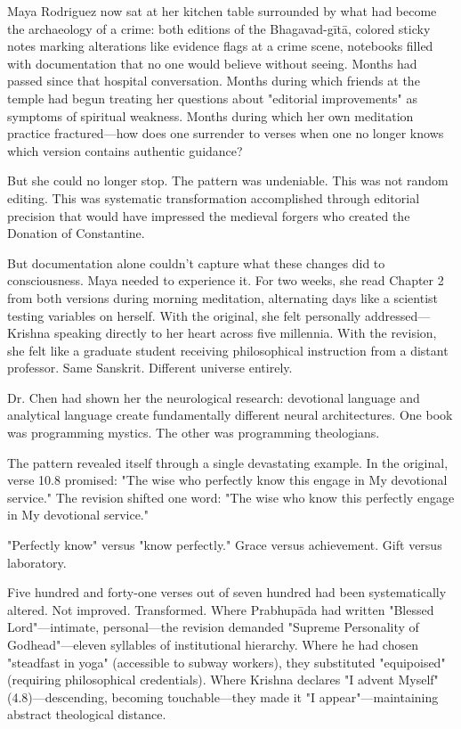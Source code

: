 \documentclass[12pt,twoside]{book}
\begin{document}
Maya Rodriguez now sat at her kitchen table surrounded by what had become the archaeology of a crime: both editions of the Bhagavad-gītā, colored sticky notes marking alterations like evidence flags at a crime scene, notebooks filled with documentation that no one would believe without seeing. Months had passed since that hospital conversation. Months during which friends at the temple had begun treating her questions about "editorial improvements" as symptoms of spiritual weakness. Months during which her own meditation practice fractured—how does one surrender to verses when one no longer knows which version contains authentic guidance?

But she could no longer stop. The pattern was undeniable. This was not random editing. This was systematic transformation accomplished through editorial precision that would have impressed the medieval forgers who created the Donation of Constantine.

But documentation alone couldn't capture what these changes did to consciousness. Maya needed to experience it. For two weeks, she read Chapter 2 from both versions during morning meditation, alternating days like a scientist testing variables on herself. With the original, she felt personally addressed—Krishna speaking directly to her heart across five millennia. With the revision, she felt like a graduate student receiving philosophical instruction from a distant professor. Same Sanskrit. Different universe entirely.

Dr. Chen had shown her the neurological research: devotional language and analytical language create fundamentally different neural architectures. One book was programming mystics. The other was programming theologians.

The pattern revealed itself through a single devastating example. In the original, verse 10.8 promised: "The wise who perfectly know this engage in My devotional service." The revision shifted one word: "The wise who know this perfectly engage in My devotional service."

"Perfectly know" versus "know perfectly." Grace versus achievement. Gift versus laboratory.

Five hundred and forty-one verses out of seven hundred had been systematically altered. Not improved. Transformed. Where Prabhupāda had written "Blessed Lord"—intimate, personal—the revision demanded "Supreme Personality of Godhead"—eleven syllables of institutional hierarchy. Where he had chosen "steadfast in yoga" (accessible to subway workers), they substituted "equipoised" (requiring philosophical credentials). Where Krishna declares "I advent Myself" (4.8)—descending, becoming touchable—they made it "I appear"—maintaining abstract theological distance.
\end{document}
